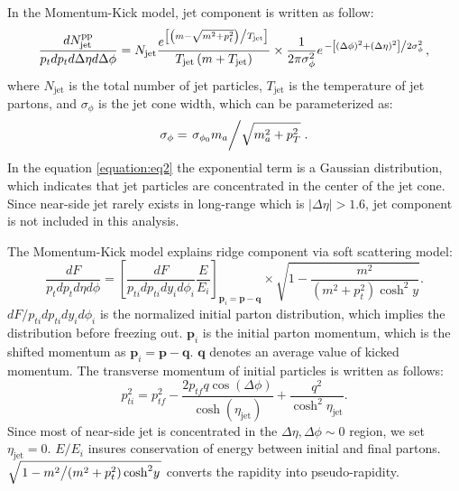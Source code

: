 \documentclass[12pt]{article}
\begin{document}
In the Momentum-Kick model, jet component is written as follow:
\begin{equation} \label{equation:eq2}
\frac{dN_{\text{jet}}^{\text{pp}}}{p_tdp_td\Delta\eta d\Delta\phi}
= N_{\text{jet}}\frac{e^{\left[ \left( m-\sqrt{m^2+p_t^2} \right) \middle/ T_{\text{jet}}\right]}}{T_{\text{jet}}\left(m+T_{\text{jet}}\right)}\times
\frac{1}{2\pi\sigma_\phi^2}e^{ \left. -\left[\left(\Delta\phi\right)^2+ \left(\Delta\eta\right)^2\right] \middle/ 2\sigma_\phi^2 \right. },
\end{equation}
where $N_{\text{jet}}$ is the total number of jet particles, $T_{\text{jet}}$ is the temperature of jet partons, and $\sigma_\phi$ is the jet cone width, which can be parameterized as:
\begin{equation} \label{equation:eq3}
\sigma_\phi= \left. \sigma_{\phi_0}m_a \middle/ \sqrt{m_a^2+p_T^2} \right. .
\end{equation}
In the equation \ref{equation:eq2} the exponential term is a Gaussian distribution, which indicates that jet particles are concentrated in the center of the jet cone. 
Since near-side jet rarely exists in long-range which is $\left|\Delta\eta\right|>1.6$, jet component is not included in this analysis.

The Momentum-Kick model explains ridge component via soft scattering model:
\begin{equation} \label{equation:eq4}
\frac{dF}{p_tdp_td\eta d\phi}
= \left[\frac{dF}{p_{ti}dp_{ti}dy_id\phi_i} \frac{E}{E_i} \right]_{\mathbf{p}_i=\mathbf{p}-\mathbf{q}}\times\sqrt{1-\frac{m^2}{\left(m^2+p_t^2\right){\cosh}^2y}}.
\end{equation}
$ dF / p_{ti}dp_{ti}dy_id\phi_i $ is the normalized initial parton distribution, which implies the distribution before freezing out.
$\mathbf{p}_i$ is the initial parton momentum, which is the shifted momentum as $\mathbf{p}_i=\mathbf{p}-\mathbf{q}$.
$\mathbf{q}$ denotes an average value of kicked momentum.
The transverse momentum of initial particles is written as follows:
\begin{equation} \label{equation:eq5}
p_{ti}^2=p_{tf}^2-\frac{2p_{tf} q \cos\left(\Delta\phi\right)}{\cosh{\left(\eta_{\text{jet}}\right)}}+\frac{q^2}{\cosh^2{\eta_{\text{jet}}}}.
\end{equation}
Since most of near-side jet is concentrated in the $\Delta\eta,\Delta\phi \sim 0$ region, we set $\eta_{\text{jet}}=0$.
$E/E_i$ insures conservation of energy between initial and final partons.
$\sqrt{ \left. 1- m^2 \middle/ \left(m^2+p_t^2\right){\cosh}^2y \right.}$ converts the rapidity into pseudo-rapidity.
\end{document}

